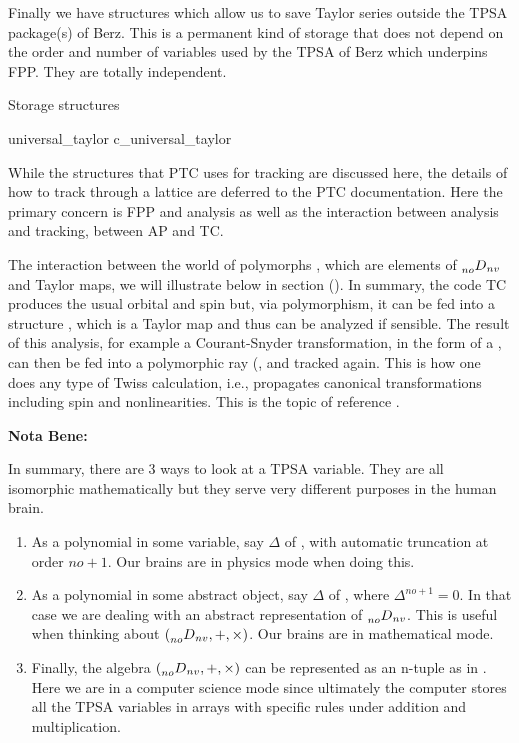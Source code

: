 \documentclass{hitec}     %
\begin{document}
Finally we have structures which allow us to save Taylor series outside the TPSA package(s) of Berz. This is a permanent kind of storage that does not depend
on the order and number of variables used by the TPSA of Berz which underpins FPP. They are totally independent.
\begin{code}
Storage structures

universal_taylor
c_universal_taylor
\end{code}

While the structures that PTC uses for tracking are discussed here, the details of how to track through
a lattice are deferred to the PTC documentation. Here the primary concern is FPP and analysis as well as the interaction between analysis and tracking, between AP and TC.

 The interaction between the world of polymorphs , which are elements of $\prescript{}{no}{D}_{nv} $ and Taylor maps, we will illustrate below in section ().
In summary, the code TC produces the usual orbital and spin but, via polymorphism, it can be fed into a structure , which is a Taylor map and thus can be analyzed if sensible. The result of this analysis, for example a Courant-Snyder transformation, in the form of a , can then be fed into a polymorphic ray (, and tracked again. This is how one does any type of Twiss calculation, i.e., propagates canonical transformations including spin and nonlinearities. This is the topic of reference \cite{thenewbook}.

{\bf Nota Bene:}

In summary, there are 3 ways to look at a TPSA variable. They are all isomorphic mathematically but they serve very different purposes in the human brain.

\begin{enumerate}
\item As a polynomial in some variable, say $\Delta $ of , with automatic truncation at order $no+1$. Our brains are in physics mode when doing this.
\item As a polynomial in some abstract object, say $\Delta $ of , where  ${\Delta }^{no+1}=0$.  In that case we are dealing with an abstract representation of $\prescript{}{no}{D}_{nv} $.  This is useful when thinking about $(\prescript{}{no}{D}_{nv},+,\times )$. Our brains are in mathematical mode. 
\item\label{itemsp} Finally, the algebra $(\prescript{}{no}{D}_{nv},+,\times )$ can be represented as an n-tuple as in . Here we are in a computer science mode since ultimately the computer stores all the TPSA variables in arrays with specific rules under addition and multiplication. 
\end{enumerate}
\end{document}
